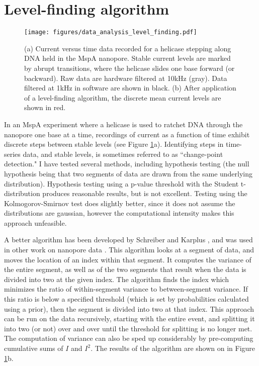 \section{Level-finding algorithm}
\label{level_finding}

\begin{figure}[H]
\begin{centering}
\texttt{[image: figures/data\_analysis\_level\_finding.pdf]}
\caption[Data analysis: level-finding]{(a) Current versus time data recorded for a helicase stepping along DNA held in the MspA nanopore.  Stable current levels are marked by abrupt transitions, where the helicase slides one base forward (or backward).  Raw data are hardware filtered at 10kHz (gray).  Data filtered at 1kHz in software are shown in black.  (b) After application of a level-finding algorithm, the discrete mean current levels are shown in red.}
\label{fig:data_analysis_levels}
\end{centering}
\end{figure}

In an MspA experiment where a helicase is used to ratchet DNA through the nanopore one base at a time, recordings of current as a function of time exhibit discrete steps between stable levels (see Figure \ref{fig:data_analysis_levels}a).  Identifying steps in time-series data, and stable levels, is sometimes referred to as ``change-point detection."  I have tested several methods, including hypothesis testing (the null hypothesis being that two segments of data are drawn from the same underlying distribution).  Hypothesis testing using a p-value threshold with the Student t-distribution produces reasonable results, but is not excellent.  Testing using the Kolmogorov-Smirnov test does slightly better, since it does not assume the distributions are gaussian, however the computational intensity makes this approach unfeasible.

A better algorithm has been developed by Schreiber and Karplus \citep{Schreiber2015}, and was used in other work on nanopore data \citep{Laszlo2014}.  This algorithm looks at a segment of data, and moves the location of an index within that segment.  It computes the variance of the entire segment, as well as of the two segments that result when the data is divided into two at the given index.  The algorithm finds the index which minimizes the ratio of within-segment variance to between-segment variance.  If this ratio is below a specified threshold (which is set by probabilities calculated using a prior), then the segment is divided into two at that index.  This approach can be run on the data recursively, starting with the entire event, and splitting it into two (or not) over and over until the threshold for splitting is no longer met.  The computation of variance can also be sped up considerably by pre-computing cumulative sums of $I$ and $I^2$.  The results of the algorithm are shown on in Figure \ref{fig:data_analysis_levels}b.


